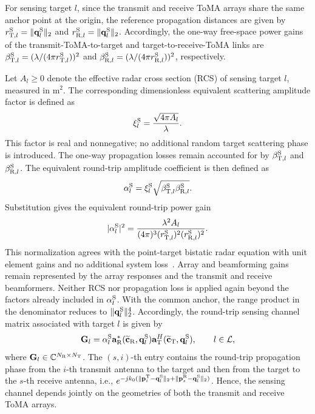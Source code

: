 \documentclass[letterpaper,journal]{IEEEtran}
\begin{document}
For sensing target $l$, since the transmit and receive ToMA arrays
share the same anchor point at the origin, the reference propagation
distances are given by
$r_{{\rm T},l}^{\rm S}=\|\mathbf q_l^{\rm S}\|_2$ and
$r_{{\rm R},l}^{\rm S}=\|\mathbf q_l^{\rm S}\|_2$.
Accordingly, the one-way free-space power gains of the
transmit-ToMA-to-target and target-to-receive-ToMA links are
$\beta_{{\rm T},l}^{\rm S}
=(\lambda/(4\pi r_{{\rm T},l}^{\rm S}))^2$
and
$\beta_{{\rm R},l}^{\rm S}
=(\lambda/(4\pi r_{{\rm R},l}^{\rm S}))^2$,
respectively.

Let $A_l\ge0$ denote the effective radar cross section (RCS) of
sensing target $l$, measured in $\mathrm{m}^2$. The corresponding
dimensionless equivalent scattering amplitude factor is defined as
\[
\xi_l^{\rm S}=\frac{\sqrt{4\pi A_l}}{\lambda}.
\]
This factor is real and nonnegative; no additional random target
scattering phase is introduced. The one-way propagation losses remain
accounted for by $\beta_{{\rm T},l}^{\rm S}$ and
$\beta_{{\rm R},l}^{\rm S}$. The equivalent round-trip amplitude
coefficient is then defined as
\begin{equation}
\alpha_l^{\rm S}
=
\xi_l^{\rm S}
\sqrt{
\beta_{{\rm T},l}^{\rm S}
\beta_{{\rm R},l}^{\rm S}
}.
\label{eq:round_trip_coeff}
\end{equation}
Substitution gives the equivalent round-trip power gain
\[
|\alpha_l^{\rm S}|^2
=\frac{\lambda^2 A_l}
{(4\pi)^3(r_{{\rm T},l}^{\rm S})^2(r_{{\rm R},l}^{\rm S})^2}.
\]
This normalization agrees with the point-target bistatic radar equation
with unit element gains and no additional system loss~\cite{mathworks_radar_equation}.
Array and beamforming gains remain represented by the array responses
and the transmit and receive beamformers. Neither RCS nor propagation
loss is applied again beyond the factors already included in
$\alpha_l^{\rm S}$. With the common anchor, the range product in the
denominator reduces to $\|\mathbf q_l^{\rm S}\|_2^4$.
Accordingly, the round-trip sensing channel matrix associated with
target $l$ is given by
\begin{equation}
\mathbf G_l
=
\alpha_l^{\rm S}
\mathbf a_{\rm R}^{*}
(\widetilde{\mathbf c}_{\rm R},\mathbf q_l^{\rm S})
\mathbf a_{\rm T}^{H}
(\widetilde{\mathbf c}_{\rm T},\mathbf q_l^{\rm S}),
\qquad
l\in\mathcal L,
\label{eq:sensing_channel}
\end{equation}
where $\mathbf G_l\in\mathbb C^{N_{\rm R}\times N_{\rm T}}$.
The $(s,i)$-th entry contains the round-trip propagation phase from
the $i$-th transmit antenna to the target and then from the target to
the $s$-th receive antenna, i.e.,
$e^{-j k_0(\|\mathbf p_i^{\rm T}-\mathbf q_l^{\rm S}\|_2+
\|\mathbf p_s^{\rm R}-\mathbf q_l^{\rm S}\|_2)}$.
Hence, the sensing channel depends jointly on the geometries of both
the transmit and receive ToMA arrays.
\end{document}
